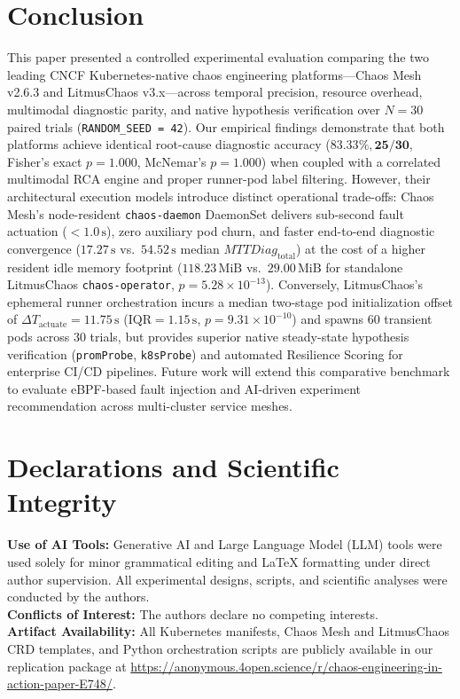 \section{Conclusion}
\label{sec:conclusion}

This paper presented a controlled experimental evaluation comparing the two leading CNCF Kubernetes-native chaos engineering platforms—Chaos Mesh v2.6.3 and LitmusChaos v3.x—across temporal precision, resource overhead, multimodal diagnostic parity, and native hypothesis verification over $N=30$ paired trials (\texttt{RANDOM\_SEED = 42}). Our empirical findings demonstrate that both platforms achieve identical root-cause diagnostic accuracy ($\mathbf{83.33\%, 25/30}$, Fisher's exact $p = 1.000$, McNemar's $p = 1.000$) when coupled with a correlated multimodal RCA engine and proper runner-pod label filtering. However, their architectural execution models introduce distinct operational trade-offs: Chaos Mesh's node-resident \texttt{chaos-daemon} DaemonSet delivers sub-second fault actuation ($< 1.0\,\text{s}$), zero auxiliary pod churn, and faster end-to-end diagnostic convergence ($17.27\,\text{s}$ vs.\ $54.52\,\text{s}$ median $MTTDiag_{\text{total}}$) at the cost of a higher resident idle memory footprint ($118.23\,\text{MiB}$ vs.\ $29.00\,\text{MiB}$ for standalone LitmusChaos \texttt{chaos-operator}, $p = 5.28 \times 10^{-13}$). Conversely, LitmusChaos's ephemeral runner orchestration incurs a median two-stage pod initialization offset of $\Delta T_{\text{actuate}} = 11.75\,\text{s}$ ($\text{IQR} = 1.15\,\text{s}$, $p = 9.31 \times 10^{-10}$) and spawns $60$ transient pods across $30$ trials, but provides superior native steady-state hypothesis verification (\texttt{promProbe}, \texttt{k8sProbe}) and automated Resilience Scoring for enterprise CI/CD pipelines. Future work will extend this comparative benchmark to evaluate eBPF-based fault injection and AI-driven experiment recommendation across multi-cluster service meshes.

\section*{Declarations and Scientific Integrity}
\label{sec:declarations}

\textbf{Use of AI Tools:} Generative AI and Large Language Model (LLM) tools were used solely for minor grammatical editing and LaTeX formatting under direct author supervision. All experimental designs, scripts, and scientific analyses were conducted by the authors. \\
\textbf{Conflicts of Interest:} The authors declare no competing interests. \\
\textbf{Artifact Availability:} All Kubernetes manifests, Chaos Mesh and LitmusChaos CRD templates, and Python orchestration scripts are publicly available in our replication package at \url{https://anonymous.4open.science/r/chaos-engineering-in-action-paper-E748/}.

